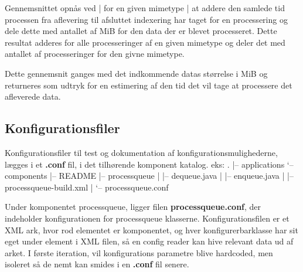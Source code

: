 \documentclass{article}
\begin{document}
Gennemsnittet opnås ved | for en given mimetype | at addere den
samlede tid processen fra aflevering til afsluttet indexering har
taget for en processering og dele dette med antallet af MiB for den
data der er blevet processeret. Dette resultat adderes for alle
processeringer af en given mimetype og deler det med antallet af
processeringer for den givne mimetype.

Dette gennemsnit ganges med det indkommende datas størrelse i MiB og
returneres som udtryk for en estimering af den tid det vil tage at
processere det afleverede data.

\subsection{Konfigurationsfiler}

Konfigurationsfiler til test og dokumentation af
konfigurationsmulighederne, lægges i et \textbf{.conf} fil, i det
tilhørende komponent katalog. eks: 
.  
|-- applications 
`-- components
    |-- README 
    |-- processqueue
    | |-- dequeue.java
    | |-- enqueue.java
    | |-- processqueue-build.xml 
    | `-- processqueue.conf
    
Under komponentet processqueue, ligger filen
\textbf{processqueue.conf}, der indeholder konfigurationen for
processqueue klasserne. Konfigurationsfilen er et XML ark, hvor
rod elementet er komponentet, og hver konfigurerbarklasse har sit
eget under element i XML filen, så en config reader kan hive
relevant data ud af arket. I første iteration, vil konfigurations
parametre blive hardcoded, men isoleret så de nemt kan smides i en
\textbf{.conf} fil senere.
\end{document}
